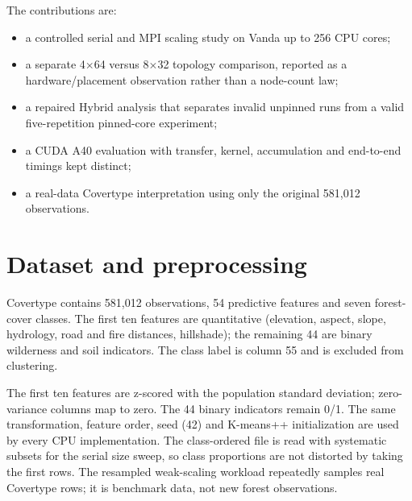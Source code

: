 \documentclass[10pt,a4paper]{article}
\begin{document}
The contributions are:
\begin{itemize}
\item a controlled serial and MPI scaling study on Vanda up to 256 CPU cores;
\item a separate 4$\times$64 versus 8$\times$32 topology comparison, reported
      as a hardware/placement observation rather than a node-count law;
\item a repaired Hybrid analysis that separates invalid unpinned runs from a
      valid five-repetition pinned-core experiment;
\item a CUDA A40 evaluation with transfer, kernel, accumulation and end-to-end
      timings kept distinct;
\item a real-data Covertype interpretation using only the original 581,012
      observations.
\end{itemize}

\section{Dataset and preprocessing}
Covertype \citep{blackard1999} contains 581,012 observations, 54 predictive
features and seven forest-cover classes. The first ten features are
quantitative (elevation, aspect, slope, hydrology, road and fire distances,
hillshade); the remaining 44 are binary wilderness and soil indicators. The
class label is column 55 and is excluded from clustering.

The first ten features are z-scored with the population standard deviation;
zero-variance columns map to zero. The 44 binary indicators remain 0/1. The
same transformation, feature order, seed (42) and K-means++ initialization
\citep{arthur2007} are used by every CPU implementation. The class-ordered file
is read with systematic subsets for the serial size sweep, so class
proportions are not distorted by taking the first rows. The resampled
weak-scaling workload repeatedly samples real Covertype rows; it is benchmark
data, not new forest observations.
\end{document}
